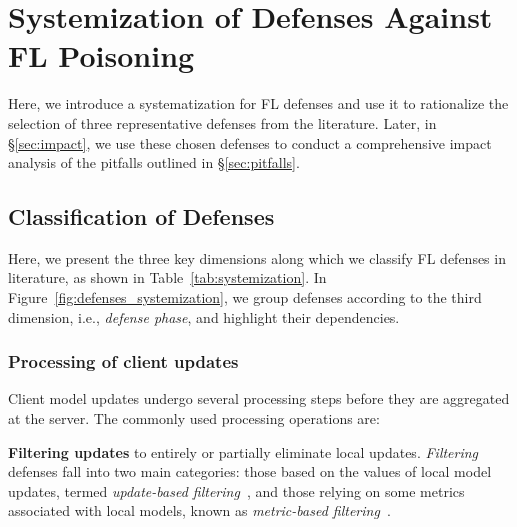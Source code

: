 \section{Systemization of Defenses Against  FL Poisoning}\label{sec:systemization}
Here, we introduce a systematization for FL defenses and use it to
rationalize the selection of three representative defenses from the literature. Later, 
in \S\ref{sec:impact}, we use these chosen defenses to conduct a comprehensive impact analysis of the pitfalls outlined in \S\ref{sec:pitfalls}.
\subsection{Classification of Defenses}\label{systemization:classification}
Here, we present the three key dimensions along which we classify FL defenses in literature, as shown in Table~\ref{tab:systemization}. In Figure~\ref{fig:defenses_systemization}, we group defenses according to the third dimension, i.e., \emph{defense phase}, and highlight their dependencies. 

\subsubsection{Processing of client updates}\label{systemization:classification:operation}
Client model updates undergo several processing steps before they are aggregated at the server. The commonly used processing operations are:

\noindent\textbf{Filtering updates} 
to entirely or partially eliminate local updates. \emph{Filtering} defenses fall into two main categories: 
those based on the values of local model updates, termed \emph{update-based filtering}~\cite{yin2018byzantine, blanchard2017machine, pillutla2019robust}, and those relying on some metrics associated with local models, known as \emph{metric-based filtering}~\cite{ranjan2022securing, jebreel2022defending, fang2020local, zhang2022fldetector}.

